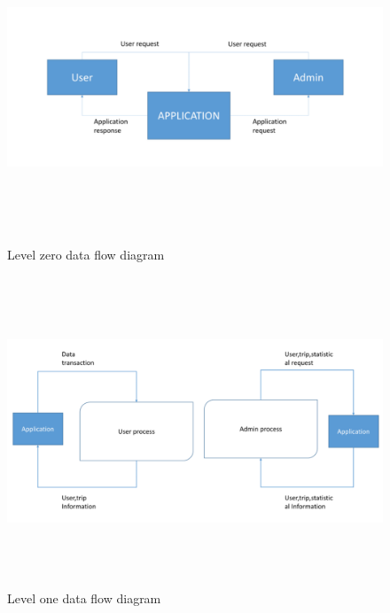 \begin{figure}[!htbp]
\centering
\includegraphics[width=\textwidth, height= 25em]{projectChapters/images/dataflow.png}
\caption{Level zero data flow diagram}
\label{fig:dataflow}
\end{figure}

\begin{figure}[!htbp]
\centering
\includegraphics[width=\textwidth, height= 25em]{projectChapters/images/dataflow2.png}
\caption{Level one data flow diagram}
\label{fig:dataflow2}
\end{figure}

